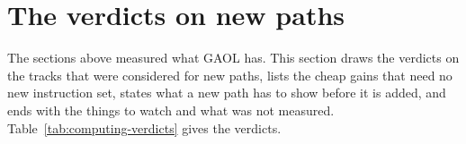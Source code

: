 \section{The verdicts on new paths}
\label{sec:new-paths}
%

The sections above measured what GAOL has. This section draws the verdicts
on the tracks that were considered for new paths, lists the cheap gains
that need no new instruction set, states what a new path has to show
before it is added, and ends with the things to watch and what was not
measured. Table~\ref{tab:computing-verdicts} gives the verdicts.

